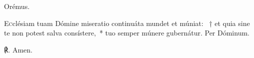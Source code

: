 Orémus.

\lettrine{E}{c}clésiam tuam Dómine miseratio continuáta mundet et múniat: ~† et quia sine te non potest salva consístere,~* tuo semper múnere gubernátur. Per Dóminum.

℟. Amen.